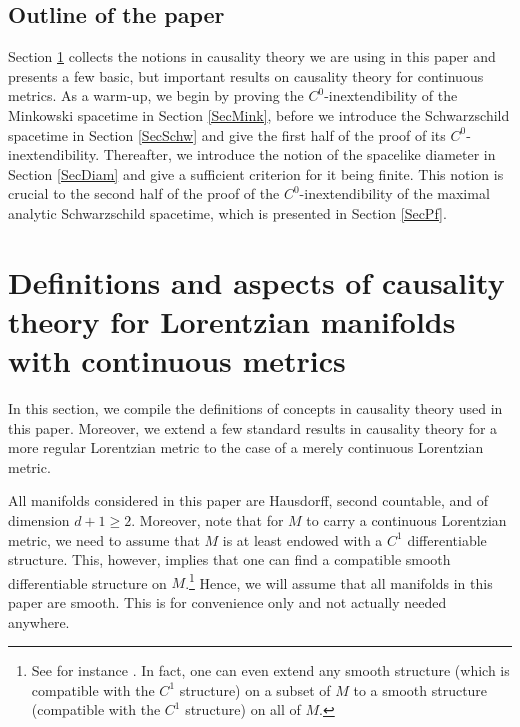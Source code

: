 \documentclass[reqno]{article}
\begin{document}
\subsection{Outline of the paper}

Section \ref{Defs} collects the notions in causality theory we are using in this paper and presents a few basic, but important results on causality theory for continuous metrics. As a warm-up, we begin by proving the $C^0$-inextendibility of the Minkowski spacetime in Section \ref{SecMink}, before we introduce the Schwarzschild spacetime in Section \ref{SecSchw} and give the first half of the proof of its $C^0$-inextendibility.  Thereafter, we introduce the notion of the spacelike diameter in Section \ref{SecDiam} and give a sufficient criterion for it being finite. This notion is crucial to the second half of the proof of the $C^0$-inextendibility of the maximal analytic Schwarzschild spacetime, which is presented in  Section \ref{SecPf}. 


















\section{Definitions and aspects of causality theory for Lorentzian manifolds with continuous metrics}
\label{Defs}

In this section, we compile the definitions of concepts in causality theory used in this paper. Moreover, we extend a few standard results in causality theory for a more regular Lorentzian metric to the case of a merely continuous Lorentzian metric.

All manifolds considered in this paper are Hausdorff, second countable, and of dimension $d+1 \geq 2$. Moreover, note that for $M$ to carry a continuous Lorentzian metric, we need to assume that $M$ is at least endowed with a $C^1$ differentiable structure. This, however, implies that one can find a compatible smooth differentiable structure on $M$.\footnote{See for instance \cite{Hirsch12}. In fact, one can even extend any smooth structure (which is compatible with the $C^1$ structure) on a subset of $M$ to a smooth structure (compatible with the $C^1$ structure) on all of $M$.}   Hence, we will assume that all manifolds in this paper are smooth. This is for convenience only and not actually needed anywhere.
\end{document}
